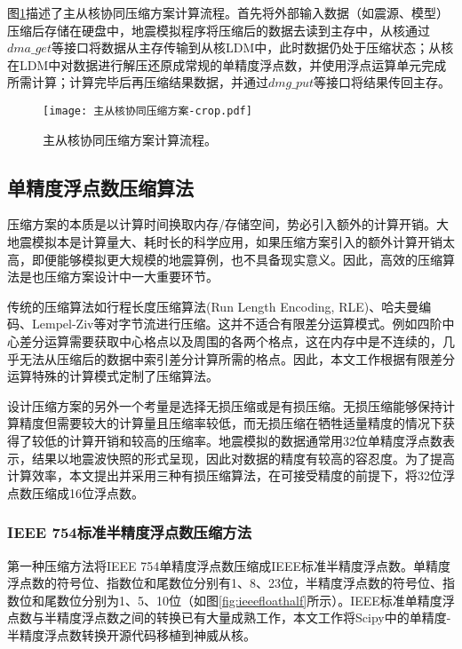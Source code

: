 图\ref{fig:compression-workflow}描述了主从核协同压缩方案计算流程。首先将外部输入数据（如震源、模型）压缩后存储在硬盘中，地震模拟程序将压缩后的数据去读到主存中，从核通过$dma\_get$等接口将数据从主存传输到从核LDM中，此时数据仍处于压缩状态；从核在LDM中对数据进行解压还原成常规的单精度浮点数，并使用浮点运算单元完成所需计算；计算完毕后再压缩结果数据，并通过$dmg\_put$等接口将结果传回主存。

\begin{figure}[ht]
\centering
\texttt{[image: 主从核协同压缩方案-crop.pdf]}
\caption{主从核协同压缩方案计算流程。}
\label{fig:compression-workflow}
\end{figure}

\subsection{单精度浮点数压缩算法}

压缩方案的本质是以计算时间换取内存/存储空间，势必引入额外的计算开销。大地震模拟本是计算量大、耗时长的科学应用，如果压缩方案引入的额外计算开销太高，即便能够模拟更大规模的地震算例，也不具备现实意义。因此，高效的压缩算法是也压缩方案设计中一大重要环节。

传统的压缩算法如行程长度压缩算法(Run Length Encoding, RLE)、哈夫曼编码、Lempel-Ziv等对字节流进行压缩。这并不适合有限差分运算模式。例如四阶中心差分运算需要获取中心格点以及周围的各两个格点，这在内存中是不连续的，几乎无法从压缩后的数据中索引差分计算所需的格点。因此，本文工作根据有限差分运算特殊的计算模式定制了压缩算法。

设计压缩方案的另外一个考量是选择无损压缩或是有损压缩。无损压缩能够保持计算精度但需要较大的计算量且压缩率较低，而无损压缩在牺牲适量精度的情况下获得了较低的计算开销和较高的压缩率。地震模拟的数据通常用32位单精度浮点数表示，结果以地震波快照的形式呈现，因此对数据的精度有较高的容忍度。为了提高计算效率，本文提出并采用三种有损压缩算法，在可接受精度的前提下，将32位浮点数压缩成16位浮点数。

\subsubsection{IEEE 754标准半精度浮点数压缩方法}
第一种压缩方法将IEEE 754单精度浮点数压缩成IEEE标准半精度浮点数。单精度浮点数的符号位、指数位和尾数位分别有1、8、23位，半精度浮点数的符号位、指数位和尾数位分别为1、5、10位（如图\ref{fig:ieeefloathalf}所示）。IEEE标准单精度浮点数与半精度浮点数之间的转换已有大量成熟工作\cite{van2008fast}，本文工作将Scipy\cite{jones2014scipy}中的单精度-半精度浮点数转换开源代码移植到神威从核。

